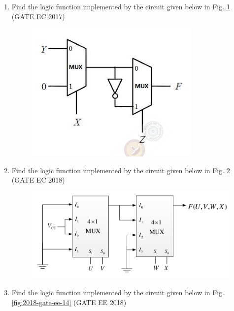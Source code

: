 \begin{enumerate}
\item
\label{prob:2017-gate-ec-16}
Find the logic function implemented by the circuit given below
in Fig.
\ref{fig:2017-gate-ec-16}
\hfill (GATE EC 2017)
\begin{figure}[H]
	\centering
	\includegraphics[width=\columnwidth]{figs/2017-gate-ec-16.png}
	\caption{}
	\label{fig:2017-gate-ec-16}
\end{figure}
\item
\label{prob:2018-gate-ec-31}
Find the logic function implemented by the circuit given below
in Fig.
\ref{fig:2018-gate-ec-31}
\hfill (GATE EC 2018)
\begin{figure}[H]
	\centering
	\includegraphics[width=\columnwidth]{figs/2018-gate-ec-31.png}
	\caption{}
	\label{fig:2018-gate-ec-31}
\end{figure}
\item
\label{prob:2018-gate-ee-14}
Find the logic function implemented by the circuit given below
in Fig.
\ref{fig:2018-gate-ee-14}
\hfill (GATE EE 2018)

\end{enumerate}
